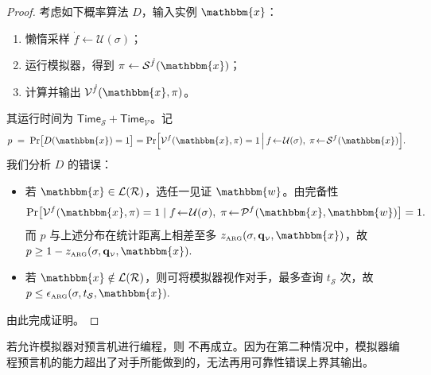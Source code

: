 \documentclass[american,singlepageview]{snargs-book-zh}
\newcommand{\Relation}{\mathcal{R}}
\newcommand{\Language}{\mathcal{L}}
\newcommand{\GetLanguage}[1]{\Language(#1)}
\newcommand{\Instance}{\mathbbm{x}}
\newcommand{\Witness}{\mathbbm{w}}
\newcommand{\ProtoProver}{P}
\newcommand{\ProtoVerifier}{V}
\newcommand{\ProtoSimulator}{S}
\newcommand{\ProtoSoundnessError}{\epsilon}
\newcommand{\ProtoZKError}{z}
\newcommand{\ProtoTime}{\mathsf{Time}}
\newcommand{\NPDecider}{D}
\newcommand{\ARGSubscript}{\scriptscriptstyle\mathrm{ARG}}
\newcommand{\ARGFormat}[1]{\mathcal{#1}}
\newcommand{\ARGProver}{\ARGFormat{\ProtoProver}}
\newcommand{\ARGVerifier}{\ARGFormat{\ProtoVerifier}}
\newcommand{\ARGSimulator}{\ARGFormat{\ProtoSimulator}}
\newcommand{\ARGString}{\pi}
\newcommand{\ARGNASoundnessError}{\ProtoSoundnessError_{\ARGSubscript}}
\newcommand{\ARGZKError}{\ProtoZKError_{\ARGSubscript}}
\newcommand{\ARGComplexityFormat}[1]{\mathbf{#1}}
\newcommand{\ARGQueryV}{\ARGComplexityFormat{q}_{\scriptscriptstyle\ARGVerifier}}
\newcommand{\ROFunction}{f}
\newcommand{\ROQueryBound}{t}
\newcommand{\RODistribution}[1]{\mathcal{U}(#1)}
\newcommand{\ROOutputSize}{\sigma}
\newcommand{\Lazy}[1]{\dot{#1}}
\begin{document}
\begin{proof}
考虑如下概率算法 $\NPDecider$，输入实例 $\Instance$：
\begin{enumerate}[noitemsep]
  \item 懒惰采样 $\Lazy{\ROFunction}\gets\RODistribution{\ROOutputSize}$；
  \item 运行模拟器，得到 $\ARGString\gets\ARGSimulator^{\Lazy{\ROFunction}}(\Instance)$；
  \item 计算并输出 $\ARGVerifier^{\Lazy{\ROFunction}}(\Instance,\ARGString)$。
\end{enumerate}
其运行时间为 $\ProtoTime_{\ARGSimulator}+\ProtoTime_{\ARGVerifier}$。记
\[
  p \;=\;
  \Pr\bigl[\NPDecider(\Instance)=1\bigr]
  =
  \Pr\Bigl[
    \ARGVerifier^{\ROFunction}(\Instance,\ARGString)=1
    \,\Big|\,
    \ROFunction\!\gets\!\RODistribution{\ROOutputSize},\;
    \ARGString\!\gets\!\ARGSimulator^{\ROFunction}(\Instance)
  \Bigr].
\]
我们分析 $\NPDecider$ 的错误：
\begin{itemize}
  \item 若 $\Instance\in\GetLanguage{\Relation}$，选任一见证 $\Witness$。由完备性
  \[
    \Pr\bigl[\ARGVerifier^{\ROFunction}(\Instance,\ARGString)=1
      \mid
      \ROFunction\!\gets\!\RODistribution{\ROOutputSize},\;
      \ARGString\!\gets\!\ARGProver^{\ROFunction}(\Instance,\Witness)
    \bigr]=1.
  \]
  而 $p$ 与上述分布在统计距离上相差至多 $\ARGZKError(\ROOutputSize,\ARGQueryV,\Instance)$，故
  \(
    p \ge 1-\ARGZKError(\ROOutputSize,\ARGQueryV,\Instance).
  \)

  \item 若 $\Instance\notin\GetLanguage{\Relation}$，则可将模拟器视作对手，最多查询 $\ROQueryBound_{\ARGSimulator}$ 次，故
  \(
    p \le \ARGNASoundnessError(\ROOutputSize,\ROQueryBound_{\ARGSimulator},\Instance).
  \)
\end{itemize}
由此完成证明。
\end{proof}

\begin{remark}
\label{remark:limitation-fails-with-ro-programming}
若允许模拟器对预言机进行编程，则 不再成立。因为在第二种情况中，模拟器编程预言机的能力超出了对手所能做到的，无法再用可靠性错误上界其输出。
\end{remark}


\end{document}
